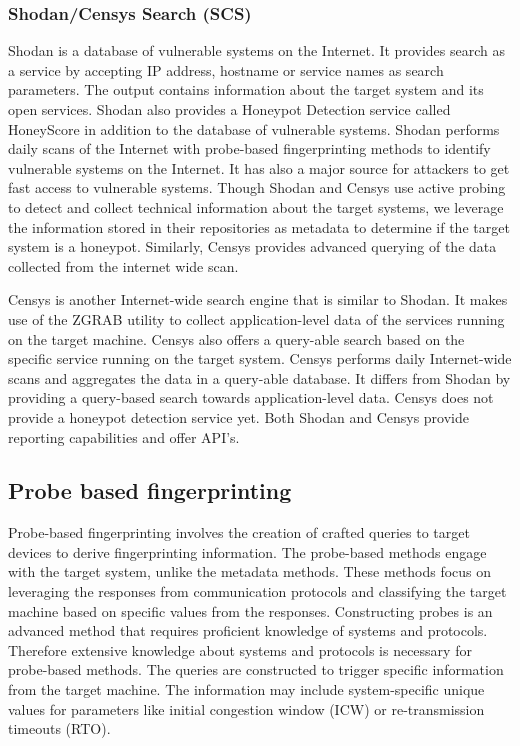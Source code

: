 \subsubsection{Shodan/Censys Search (SCS)}
Shodan is a database of vulnerable systems on the Internet. It provides search as a service by accepting IP address, hostname or service names as search parameters. The output contains information about the target system and its open services. Shodan also provides a Honeypot Detection service called HoneyScore \cite{SHODAN} in addition to the database of vulnerable systems. Shodan performs daily scans of the Internet with probe-based fingerprinting methods to identify vulnerable systems on the Internet. It has also a major source for attackers to get fast access to vulnerable systems. Though Shodan and Censys use active probing to detect and collect technical information about the target systems, we leverage the information stored in their repositories as metadata to determine if the target system is a honeypot. Similarly, Censys provides advanced querying of the data collected from the internet wide scan. 

Censys is another Internet-wide search engine that is similar to Shodan. It makes use of the ZGRAB \cite{censys} utility to collect application-level data of the services running on the target machine. Censys also offers a query-able search based on the specific service running on the target system. Censys performs daily Internet-wide scans and aggregates the data in a query-able database. It differs from Shodan by providing a query-based search towards application-level data. Censys does not provide a honeypot detection service yet. Both Shodan and Censys provide reporting capabilities and offer API's. 

\subsection{Probe based fingerprinting}
\label{Probe Based}
Probe-based fingerprinting involves the creation of crafted queries to target devices to derive fingerprinting information. The probe-based methods engage with the target system, unlike the metadata methods. These methods focus on leveraging the responses from communication protocols and classifying the target machine based on specific values from the responses. Constructing probes is an advanced method that requires proficient knowledge of systems and protocols. Therefore extensive knowledge about systems and protocols is necessary for probe-based methods. The queries are constructed to trigger specific information from the target machine. The information may include system-specific unique values for parameters like initial congestion window (ICW) or re-transmission timeouts (RTO). 

